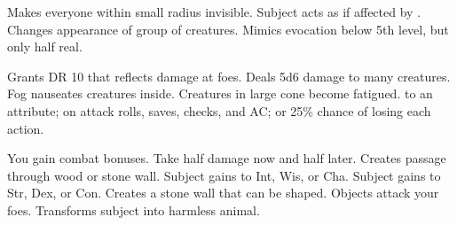 \begin{swspelllist}
   Makes everyone within small radius invisible.
   Subject acts as if affected by .
   Changes appearance of group of creatures.
   Mimics evocation below 5th level, but only half real.

   Grants DR 10 that reflects damage at foes.
   Deals 5d6 damage to many creatures.
   Fog nauseates creatures inside.
   Creatures in large cone become fatigued.
    to an attribute;  on attack rolls, saves, checks, and AC; or 25\% chance of losing each action.
  \spellheadrestricted{}

  \M You gain combat bonuses.
   Take half damage now and half later. 
   Creates passage through wood or stone wall.
   Subject gains  to Int, Wis, or Cha.
   Subject gains  to Str, Dex, or Con.
   Creates a stone wall that can be shaped.
   Objects attack your foes.
   Transforms subject into harmless animal.
\end{swspelllist}

